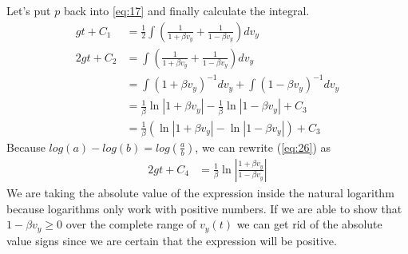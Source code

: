 \documentclass[paper=a4, fontsize=11pt]{scrartcl} %
\numberwithin{equation}{section} %
\numberwithin{figure}{section} %
\numberwithin{table}{section} %
\begin{document}
Let's put $p$ back into \ref{eq:17} and finally calculate the integral.
\begin{align} 
g t + C_1  &= \frac{1}{2} \int \left(\frac{1}{1 + \beta v_y} + \frac{1}{1 - \beta v_y}\right) d v_y  \\
2g t + C_2 &= \int \left(\frac{1}{1 + \beta v_y} + \frac{1}{1 - \beta v_y}\right) d v_y \\
           &= \int (1 + \beta v_y)^{-1} d v_y + \int (1 - \beta v_y)^{-1} d v_y \\
           &=  \frac{1}{\beta} \ln{\left|1 + \beta v_y \right|} -
               \frac{1}{\beta} \ln{\left|1 - \beta v_y \right|} + C_3 \\
           &=  \frac{1}{\beta} \left( \ln{\left|1 + \beta v_y \right|} -
               \ln{\left|1 - \beta v_y \right|} \right) + C_3 \label{eq:26}
\end{align}
Because $log(a) - log(b) = log(\frac{a}{b})$, we can rewrite (\ref{eq:26}) as
\begin{align} 
2g t + C_4 &=  \frac{1}{\beta} \ln{\left|\frac{1 + \beta v_y}{1 - \beta v_y} \right|} \label{eq:27}
\end{align}
We are taking the absolute value of the expression inside the natural logarithm because logarithms only work with
positive numbers. If we are able to show that $1 - \beta v_y \geq 0$ over the complete range of $v_y(t)$ we can
get rid of the absolute value signs since we are certain that the expression will be positive.
\end{document}
